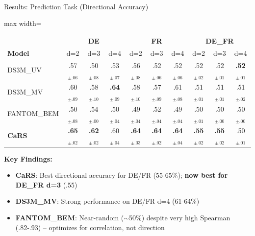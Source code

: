 \documentclass[aspectratio=169]{beamer}
\begin{document}
\begin{frame}{Results: Prediction Task (Directional Accuracy)}
\begin{table}
\centering
\small
\begin{adjustbox}{max width=\textwidth}
\begin{tabular}{l|ccc|ccc|ccc}
\toprule
& \multicolumn{3}{c|}{\textbf{DE}} & \multicolumn{3}{c|}{\textbf{FR}} & \multicolumn{3}{c}{\textbf{DE\_FR}} \\
\textbf{Model} & d=2 & d=3 & d=4 & d=2 & d=3 & d=4 & d=2 & d=3 & d=4 \\
\midrule
DS3M\_UV & .57$_{\pm.06}$ & .50$_{\pm.08}$ & .53$_{\pm.07}$ & .56$_{\pm.08}$ & .52$_{\pm.06}$ & .52$_{\pm.06}$ & .52$_{\pm.02}$ & .52$_{\pm.01}$ & \textbf{.52}$_{\pm.01}$ \\
DS3M\_MV & .60$_{\pm.09}$ & .58$_{\pm.10}$ & \textbf{.64}$_{\pm.09}$ & .58$_{\pm.10}$ & .57$_{\pm.09}$ & .61$_{\pm.08}$ & .51$_{\pm.01}$ & .51$_{\pm.01}$ & .51$_{\pm.02}$ \\
FANTOM\_BEM & .50$_{\pm.08}$ & .54$_{\pm.00}$ & .50$_{\pm.04}$ & .49$_{\pm.04}$ & .52$_{\pm.04}$ & .49$_{\pm.04}$ & .50$_{\pm.01}$ & .50$_{\pm.00}$ & .50$_{\pm.00}$ \\
\midrule
\textbf{CaRS} & \textbf{.65}$_{\pm.02}$ & \textbf{.62}$_{\pm.02}$ & .60$_{\pm.04}$ & \textbf{.64}$_{\pm.03}$ & \textbf{.64}$_{\pm.02}$ & \textbf{.64}$_{\pm.04}$ & \textbf{.55}$_{\pm.02}$ & \textbf{.55}$_{\pm.02}$ & .50$_{\pm.01}$ \\
\bottomrule
\end{tabular}
\end{adjustbox}
\end{table}


\vspace{0.2cm}
\textbf{Key Findings:}
\begin{itemize}
    \item \textbf{CaRS}: Best directional accuracy for DE/FR (55-65\%); \textbf{now best for DE\_FR d=3} (.55)
    \item \textbf{DS3M\_MV}: Strong performance on DE/FR d=4 (61-64\%)
    \item \textbf{FANTOM\_BEM}: Near-random ($\sim$50\%) despite very high Spearman (.82-.93) -- optimizes for correlation, not direction
\end{itemize}
\end{frame}
\end{document}
